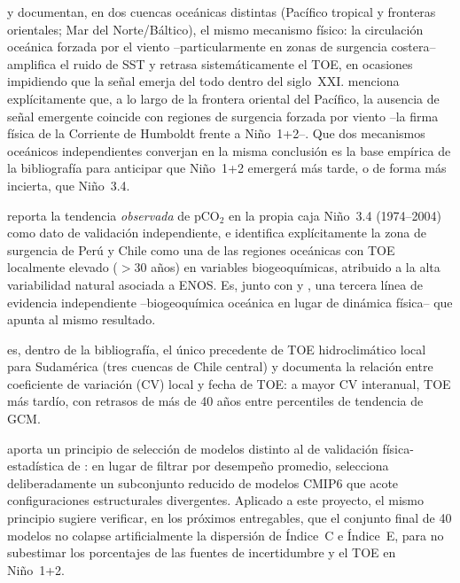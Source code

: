 \documentclass[11pt,a4paper]{article}
\begin{document}
\citet{larson2025} y \citet{poul2025} documentan, en dos cuencas oceánicas distintas (Pacífico tropical y fronteras orientales; Mar del Norte/Báltico), el mismo mecanismo físico: la circulación oceánica forzada por el viento --particularmente en zonas de surgencia costera-- amplifica el ruido de SST y retrasa sistemáticamente el TOE, en ocasiones impidiendo que la señal emerja del todo dentro del siglo~XXI. \citet{larson2025} menciona explícitamente que, a lo largo de la frontera oriental del Pacífico, la ausencia de señal emergente coincide con regiones de surgencia forzada por viento --la firma física de la Corriente de Humboldt frente a Ni\~no~1+2--. Que dos mecanismos oceánicos independientes converjan en la misma conclusión es la base empírica de la bibliografía para anticipar que Ni\~no~1+2 emergerá más tarde, o de forma más incierta, que Ni\~no~3.4.

\citet{keller2014} reporta la tendencia \emph{observada} de pCO$_2$ en la propia caja Ni\~no~3.4 (1974--2004) como dato de validación independiente, e identifica explícitamente la zona de surgencia de Perú y Chile como una de las regiones oceánicas con TOE localmente elevado ($>$30 años) en variables biogeoquímicas, atribuido a la alta variabilidad natural asociada a ENOS. Es, junto con \citet{larson2025} y \citet{poul2025}, una tercera línea de evidencia independiente --biogeoquímica oceánica en lugar de dinámica física-- que apunta al mismo resultado.

\citet{chadwick2019} es, dentro de la bibliografía, el único precedente de TOE hidroclimático local para Sudamérica (tres cuencas de Chile central) y documenta la relación entre coeficiente de variación (CV) local y fecha de TOE: a mayor CV interanual, TOE más tardío, con retrasos de más de 40 años entre percentiles de tendencia de GCM. 

\citet{lois2026} aporta un principio de selección de modelos distinto al de validación física-estadística de \citet{bruno2023}: en lugar de filtrar por desempeño promedio, selecciona deliberadamente un subconjunto reducido de modelos CMIP6 que acote configuraciones estructurales divergentes. Aplicado a este proyecto, el mismo principio sugiere verificar, en los próximos entregables, que el conjunto final de 40 modelos no colapse artificialmente la dispersión de Índice~C e Índice~E, para no subestimar los porcentajes de las fuentes de incertidumbre y el TOE en Ni\~no~1+2.
\end{document}
